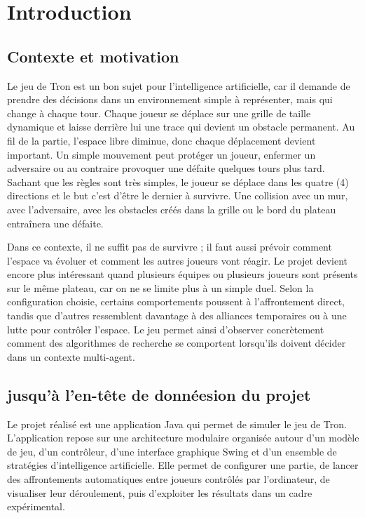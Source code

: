 \documentclass[11pt,a4paper]{article}
\begin{document}
\tableofcontents
\newpage

\section{Introduction}

\subsection{Contexte et motivation}

Le jeu de Tron est un bon sujet pour l'intelligence artificielle, car il demande de prendre des décisions dans un environnement simple à représenter, mais qui change à chaque tour. Chaque joueur se déplace sur une grille de taille dynamique et laisse derrière lui une trace qui devient un obstacle permanent. Au fil de la partie, l'espace libre diminue, donc chaque déplacement devient important. Un simple mouvement peut protéger un joueur, enfermer un adversaire ou au contraire provoquer une défaite quelques tours plus tard. Sachant que les règles sont très simples, le joueur se déplace dans les quatre (4) directions et le but c'est d'être le dernier à survivre. Une collision avec un mur, avec l'adversaire, avec les obstacles créés dans la grille ou le bord du plateau entraînera une défaite.

Dans ce contexte, il ne suffit pas de survivre ; il faut aussi prévoir comment l'espace va évoluer et comment les autres joueurs vont réagir. Le projet devient encore plus intéressant quand plusieurs équipes ou plusieurs joueurs sont présents sur le même plateau, car on ne se limite plus à un simple duel. Selon la configuration choisie, certains comportements poussent à l'affrontement direct, tandis que d'autres ressemblent davantage à des alliances temporaires ou à une lutte pour contrôler l'espace. Le jeu permet ainsi d'observer concrètement comment des algorithmes de recherche se comportent lorsqu'ils doivent décider dans un contexte multi-agent.

\subsection{jusqu'à l'en-tête de donnéesion du projet}

Le projet réalisé est une application Java qui permet de simuler le jeu de Tron. L'application repose sur une architecture modulaire organisée autour d'un modèle de jeu, d'un contrôleur, d'une interface graphique Swing et d'un ensemble de stratégies d'intelligence artificielle. Elle permet de configurer une partie, de lancer des affrontements automatiques entre joueurs contrôlés par l'ordinateur, de visualiser leur déroulement, puis d'exploiter les résultats dans un cadre expérimental.
\end{document}
